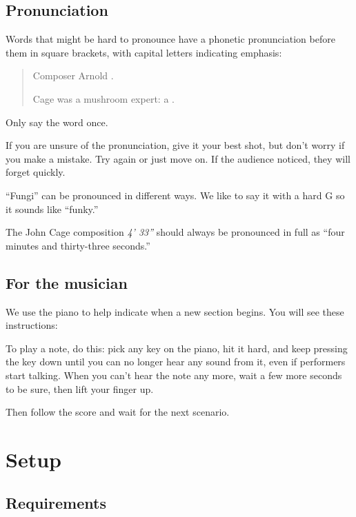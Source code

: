 \subsection*{Pronunciation}

Words that might be hard to pronounce have a phonetic pronunciation before them in square brackets, with capital letters indicating emphasis:

\begin{quote}

  Composer Arnold .

  Cage was a mushroom expert: a .

\end{quote}

Only say the word once.

If you are unsure of the pronunciation, give it your best shot, but don't worry if you make a mistake.  Try again or just move on.  If the audience noticed, they will forget quickly.

``Fungi'' can be pronounced in different ways.  We like to say it with a hard G so it sounds like ``funky.''

The John Cage composition \textit{4' 33''} should always be pronounced in full as ``four minutes and thirty-three seconds.''

\subsection*{For the musician}

We use the piano to help indicate when a new section begins.  You will see these instructions:


To play a note, do this:  pick any key on the piano, hit it hard, and keep pressing the key down until you can no longer hear any sound from it, even if performers start talking.  When you can't hear the note any more, wait a few more seconds to be sure, then lift your finger up.

Then follow the score and wait for the next scenario.

\newpage

\section{Setup}

\subsection*{Requirements}

